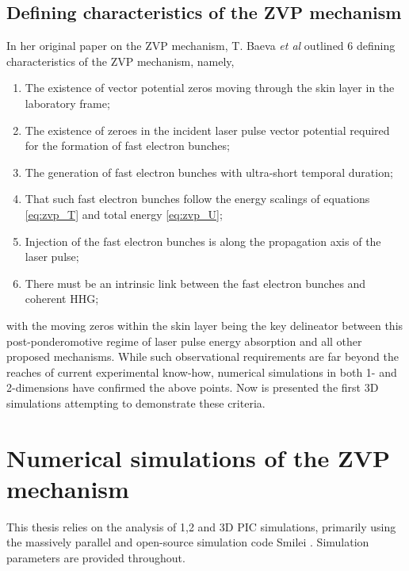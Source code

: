 \subsection{Defining characteristics of the ZVP mechanism}\label{sec:zvp-characteristics}
In her original paper on the ZVP mechanism, T. Baeva \textit{et al} \cite{baevaZeroVectorPotential2011} outlined 6 defining characteristics of the \ac{ZVP} mechanism, namely,
\begin{enumerate}
	\item The existence of vector potential zeros moving through the skin layer in the laboratory frame;
	\item The existence of zeroes in the incident laser pulse vector potential required for the formation of fast electron bunches;
	\item The generation of fast electron bunches with ultra-short temporal duration;
	\item That such fast electron bunches follow the energy scalings of equations \ref{eq:zvp_T} and total energy \ref{eq:zvp_U};
	\item Injection of the fast electron bunches is along the propagation axis of the laser pulse;
	\item There must be an intrinsic link between the fast electron bunches and coherent \ac{HHG};
\end{enumerate}
with the moving zeros within the skin layer being the key delineator between this post-ponderomotive regime of laser pulse energy absorption and all other proposed mechanisms. While such observational requirements are far beyond the reaches of current experimental know-how, numerical simulations in both 1- \cite{baevaZeroVectorPotential2011} and 2-dimensions \cite{savinAttosecondscaleAbsorptionExtreme2017} have confirmed the above points. Now is presented the first \ac{3D} simulations attempting to demonstrate these criteria.

\section{Numerical simulations of the ZVP mechanism}
This thesis relies on the analysis of 1,2 and 3D \ac{PIC} simulations, primarily using the massively parallel and open-source simulation code Smilei \cite{derouillatSmileiCollaborativeOpensource2018}. Simulation parameters are provided throughout.

